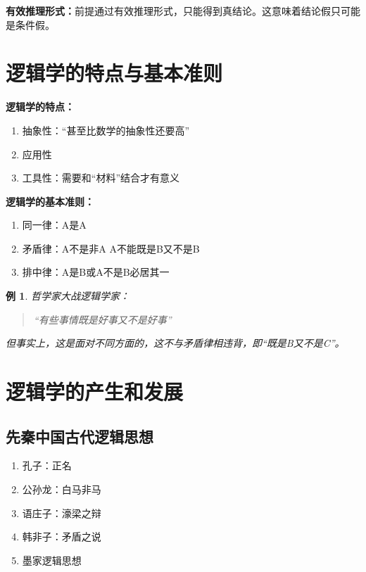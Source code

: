 \documentclass[12pt,onecolumn,a4paper]{book}
\newtheorem*{example}{例}
\numberwithin{table}{subsection}
\numberwithin{equation}{subsection}
\begin{document}
\textbf{有效推理形式：}前提通过有效推理形式，只能得到真结论。这意味着结论假只可能是条件假。

\section{逻辑学的特点与基本准则}

\textbf{逻辑学的特点：}

\begin{enumerate}[itemsep=0pt,parsep=0pt]
    \item 抽象性：“甚至比数学的抽象性还要高”
    \item 应用性
    \item 工具性：需要和“材料”结合才有意义
\end{enumerate}

\textbf{逻辑学的基本准则：}

\begin{enumerate}[itemsep=0pt,parsep=0pt]
    \item 同一律：A是A
    \item 矛盾律：A不是非A A不能既是B又不是B
    \item 排中律：A是B或A不是B必居其一
\end{enumerate}

\begin{example}
    哲学家大战逻辑学家：

    \begin{quotation}
        “有些事情既是好事又不是好事”
    \end{quotation}

    但事实上，这是面对不同方面的，这不与矛盾律相违背，即“既是B又不是C”。
\end{example}

\section{逻辑学的产生和发展}

\subsection{先秦中国古代逻辑思想}

\begin{enumerate}[itemsep=0pt,parsep=0pt]
    \item 孔子：正名
    \item 公孙龙：白马非马
    \item 语庄子：濠梁之辩
    \item 韩非子：矛盾之说
    \item 墨家逻辑思想
\end{enumerate}
\end{document}
